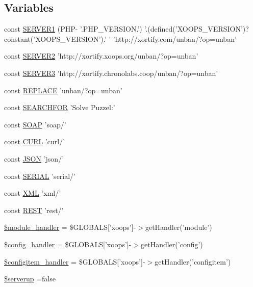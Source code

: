 \subsection*{Variables}
\begin{DoxyCompactItemize}
\item 
const \hyperlink{serverup_8php_a58e794bee7ddf93b7733e35ac71cf8ed}{S\-E\-R\-V\-E\-R1} (P\-H\-P-\/ '.P\-H\-P\-\_\-\-V\-E\-R\-S\-I\-O\-N.') '.(defined('X\-O\-O\-P\-S\-\_\-\-V\-E\-R\-S\-I\-O\-N')?constant('X\-O\-O\-P\-S\-\_\-\-V\-E\-R\-S\-I\-O\-N').' ' 'http\-://xortify.\-com/unban/?op=unban'
\item 
const \hyperlink{serverup_8php_a8a17ba733d7bbbe191983c1998184298}{S\-E\-R\-V\-E\-R2} 'http\-://xortify.\-xoops.\-org/unban/?op=unban'
\item 
const \hyperlink{serverup_8php_a4bec4584771b978c7de363db5d597cd2}{S\-E\-R\-V\-E\-R3} 'http\-://xortify.\-chronolabs.\-coop/unban/?op=unban'
\item 
const \hyperlink{serverup_8php_a4223a719e1c916bf302beb9b827fc632}{R\-E\-P\-L\-A\-C\-E} 'unban/?op=unban'
\item 
const \hyperlink{serverup_8php_a9be718298ebd995eb6a5145cf8857de4}{S\-E\-A\-R\-C\-H\-F\-O\-R} 'Solve Puzzel\-:'
\item 
const \hyperlink{serverup_8php_abd77e417d95ee59b739e54a62fe97fbc}{S\-O\-A\-P} 'soap/'
\item 
const \hyperlink{serverup_8php_ad0bd3808c083915191b2eb89901e57c0}{C\-U\-R\-L} 'curl/'
\item 
const \hyperlink{serverup_8php_addb3dc7c4a57b9cee800f894e6dc2b4d}{J\-S\-O\-N} 'json/'
\item 
const \hyperlink{serverup_8php_a2f015ddb4cf5e19b82bf7191a2a3e9fa}{S\-E\-R\-I\-A\-L} 'serial/'
\item 
const \hyperlink{serverup_8php_a5f33028773b1db8e11fcd34516dacb28}{X\-M\-L} 'xml/'
\item 
const \hyperlink{serverup_8php_a1273e4f6dfecad5cc711360770b7d784}{R\-E\-S\-T} 'rest/'
\item 
\hyperlink{serverup_8php_afe9169534dbc3935c0823c21cfbf68bb}{\$module\-\_\-handler} = \$G\-L\-O\-B\-A\-L\-S\mbox{[}'xoops'\mbox{]}-\/$>$get\-Handler('module')
\item 
\hyperlink{serverup_8php_a3906023967379550e215cdec8f56ae20}{\$config\-\_\-handler} = \$G\-L\-O\-B\-A\-L\-S\mbox{[}'xoops'\mbox{]}-\/$>$get\-Handler('config')
\item 
\hyperlink{serverup_8php_a36e83a99f91f67ee7c165be5f9e3ca93}{\$configitem\-\_\-handler} = \$G\-L\-O\-B\-A\-L\-S\mbox{[}'xoops'\mbox{]}-\/$>$get\-Handler('configitem')
\item 
\hyperlink{serverup_8php_a45a3b595731ee647ebed75a62561beeb}{\$serverup} =false
\end{DoxyCompactItemize}


